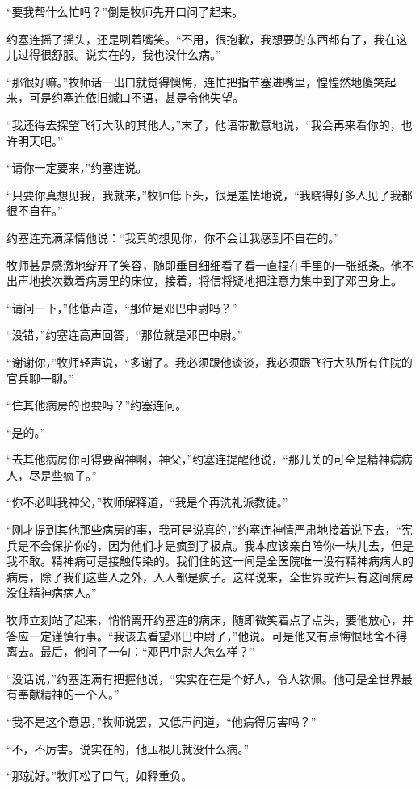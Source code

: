 “要我帮什么忙吗？”倒是牧师先开口问了起来。

约塞连摇了摇头，还是咧着嘴笑。“不用，很抱歉，我想要的东西都有了，我在这儿过得很舒服。说实在的，我也没什么病。”

“那很好嘛。”牧师话一出口就觉得懊悔，连忙把指节塞进嘴里，惶惶然地傻笑起来，可是约塞连依旧缄口不语，甚是令他失望。

“我还得去探望飞行大队的其他人，”末了，他语带歉意地说，“我会再来看你的，也许明天吧。”

“请你一定要来，”约塞连说。

“只要你真想见我，我就来，”牧师低下头，很是羞怯地说，“我晓得好多人见了我都很不自在。”

约塞连充满深情他说：“我真的想见你，你不会让我感到不自在的。”

牧师甚是感激地绽开了笑容，随即垂目细细看了看一直捏在手里的一张纸条。他不出声地挨次数着病房里的床位，接着，将信将疑地把注意力集中到了邓巴身上。

“请问一下，”他低声道，“那位是邓巴中尉吗？”

“没错，”约塞连高声回答，“那位就是邓巴中尉。”

“谢谢你，”牧师轻声说，“多谢了。我必须跟他谈谈，我必须跟飞行大队所有住院的官兵聊一聊。”

“住其他病房的也要吗？”约塞连问。

“是的。”

“去其他病房你可得要留神啊，神父，”约塞连提醒他说，“那儿关的可全是精神病病人，尽是些疯子。”

“你不必叫我神父，”牧师解释道，“我是个再洗礼派教徒。”

“刚才提到其他那些病房的事，我可是说真的，”约塞连神情严肃地接着说下去，“宪兵是不会保护你的，因为他们才是疯到了极点。我本应该亲自陪你一块儿去，但是我不敢。精神病可是接触传染的。我们住的这一间是全医院唯一没有精神病病人的病房，除了我们这些人之外，人人都是疯子。这样说来，全世界或许只有这间病房没住精神病病人。”

牧师立刻站了起来，悄悄离开约塞连的病床，随即微笑着点了点头，要他放心，并答应一定谨慎行事。“我该去看望邓巴中尉了，”他说。可是他又有点悔恨地舍不得离去。最后，他问了一句：“邓巴中尉人怎么样？”

“没话说，”约塞连满有把握他说，“实实在在是个好人，令人钦佩。他可是全世界最有奉献精神的一个人。”

“我不是这个意思，”牧师说罢，又低声问道，“他病得厉害吗？”

“不，不厉害。说实在的，他压根儿就没什么病。”

“那就好。”牧师松了口气，如释重负。

